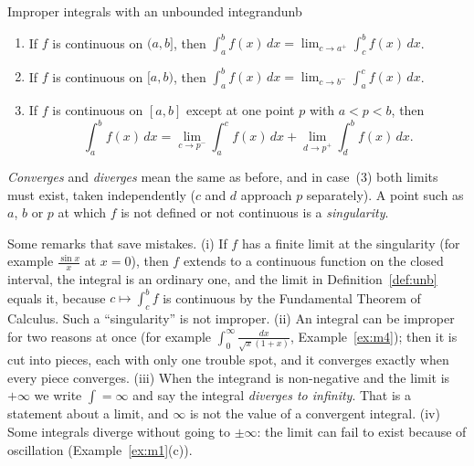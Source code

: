 \documentclass[11pt]{article}
\begin{document}
\begin{defn}{Improper integrals with an unbounded integrand}{unb}
\begin{enumerate}[label=(\arabic*),leftmargin=*]
  \item If $f$ is continuous on $(a,b]$, then $\displaystyle\int_a^bf(x)\,dx=\lim_{c\to a^+}\int_c^bf(x)\,dx$.
  \item If $f$ is continuous on $[a,b)$, then $\displaystyle\int_a^bf(x)\,dx=\lim_{c\to b^-}\int_a^cf(x)\,dx$.
  \item If $f$ is continuous on $[a,b]$ except at one point $p$ with $a<p<b$, then
  \[\int_a^bf(x)\,dx=\lim_{c\to p^-}\int_a^cf(x)\,dx+\lim_{d\to p^+}\int_d^bf(x)\,dx .\]
\end{enumerate}
\emph{Converges} and \emph{diverges} mean the same as before, and in case~(3) both limits must exist, taken independently ($c$ and $d$ approach $p$ separately). A point such as $a$, $b$ or $p$ at which $f$ is not defined or not continuous is a \emph{singularity}.
\end{defn}

Some remarks that save mistakes. (i) If $f$ has a finite limit at the singularity (for example $\frac{\sin x}x$ at $x=0$), then $f$ extends to a continuous function on the closed interval, the integral is an ordinary one, and the limit in Definition~\ref{def:unb} equals it, because $c\mapsto\int_c^bf$ is continuous by the Fundamental Theorem of Calculus. Such a ``singularity'' is not improper. (ii) An integral can be improper for two reasons at once (for example $\int_0^\infty\frac{dx}{\sqrt x(1+x)}$, Example~\ref{ex:m4}); then it is cut into pieces, each with only one trouble spot, and it converges exactly when every piece converges. (iii) When the integrand is non-negative and the limit is $+\infty$ we write $\int=\infty$ and say the integral \emph{diverges to infinity}. That is a statement about a limit, and $\infty$ is not the value of a convergent integral. (iv) Some integrals diverge without going to $\pm\infty$: the limit can fail to exist because of oscillation (Example~\ref{ex:m1}(c)).
\end{document}
